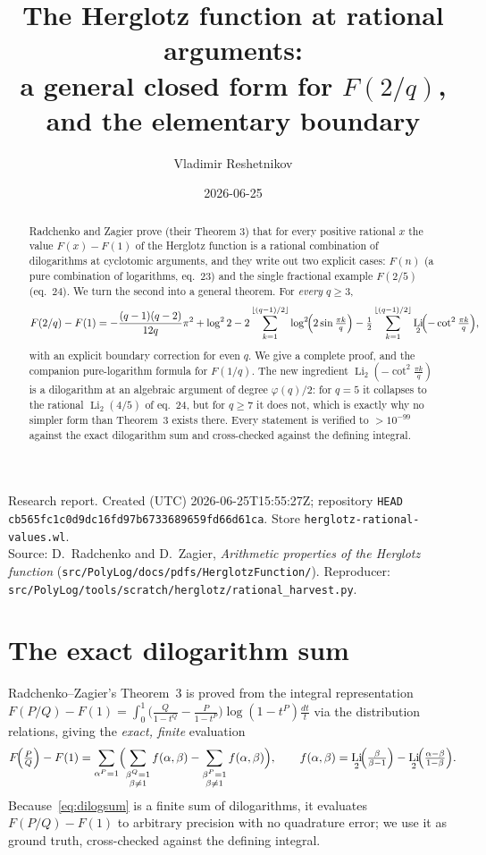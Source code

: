 \documentclass[11pt]{article}
\title{The Herglotz function at rational arguments:\\
a general closed form for $F(2/q)$, and the elementary boundary}
\author{Vladimir Reshetnikov}
\date{2026-06-25}
\DeclareMathOperator{\Li}{Li}
\theoremstyle{plain}\newtheorem{theorem}{Theorem}\newtheorem{proposition}[theorem]{Proposition}
\theoremstyle{remark}\newtheorem{remark}[theorem]{Remark}
\begin{document}
\maketitle
\begin{center}\small
Research report. Created (UTC) 2026-06-25T15:55:27Z; repository \texttt{HEAD}
\texttt{cb565fc1c0d9dc16fd97b6733689659fd66d61ca}. Store \texttt{herglotz-rational-values.wl}.\\
Source: D.\ Radchenko and D.\ Zagier, \emph{Arithmetic properties of the Herglotz function}
(\texttt{src/PolyLog/docs/pdfs/HerglotzFunction/}). Reproducer:
\texttt{src/PolyLog/tools/scratch/herglotz/rational\_harvest.py}.
\end{center}

\begin{abstract}
Radchenko and Zagier prove (their Theorem 3) that for every positive rational $x$ the value $F(x)-F(1)$ of
the Herglotz function is a rational combination of dilogarithms at cyclotomic arguments, and they write out
two explicit cases: $F(n)$ (a pure combination of logarithms, eq.~23) and the single fractional example
$F(2/5)$ (eq.~24). We turn the second into a general theorem. For \emph{every} $q\ge3$,
\[
  F(2/q)-F(1)=-\frac{(q-1)(q-2)}{12q}\pi^2+\log^2 2
  -2\sum_{k=1}^{\lfloor(q-1)/2\rfloor}\log^2\!\Bigl(2\sin\tfrac{\pi k}{q}\Bigr)
  -\tfrac12\sum_{k=1}^{\lfloor(q-1)/2\rfloor}\Li_2\!\Bigl(-\cot^2\tfrac{\pi k}{q}\Bigr),
\]
with an explicit boundary correction for even $q$. We give a complete proof, and the companion pure-logarithm
formula for $F(1/q)$. The new ingredient $\Li_2(-\cot^2\frac{\pi k}{q})$ is a dilogarithm at an algebraic
argument of degree $\varphi(q)/2$: for $q=5$ it collapses to the rational $\Li_2(4/5)$ of eq.~24, but for
$q\ge7$ it does not, which is exactly why no simpler form than Theorem~3 exists there. Every statement is
verified to $>10^{-99}$ against the exact dilogarithm sum and cross-checked against the defining integral.
\end{abstract}

\section{The exact dilogarithm sum}
Radchenko--Zagier's Theorem~3 is proved from the integral representation
$F(P/Q)-F(1)=\int_0^1\bigl(\tfrac{Q}{1-t^Q}-\tfrac{P}{1-t^P}\bigr)\log(1-t^P)\tfrac{dt}{t}$
via the distribution relations, giving the \emph{exact, finite} evaluation
\begin{equation}\label{eq:dilogsum}
  F\!\Bigl(\tfrac PQ\Bigr)-F(1)=\sum_{\alpha^P=1}\Bigl(\sum_{\substack{\beta^Q=1\\\beta\neq1}}f(\alpha,\beta)
  -\sum_{\substack{\beta^P=1\\\beta\neq1}}f(\alpha,\beta)\Bigr),\qquad
  f(\alpha,\beta)=\Li_2\!\Bigl(\tfrac{\beta}{\beta-1}\Bigr)-\Li_2\!\Bigl(\tfrac{\alpha-\beta}{1-\beta}\Bigr).
\end{equation}
Because~\eqref{eq:dilogsum} is a finite sum of dilogarithms, it evaluates $F(P/Q)-F(1)$ to arbitrary
precision with no quadrature error; we use it as ground truth, cross-checked against the defining integral.
\end{document}
